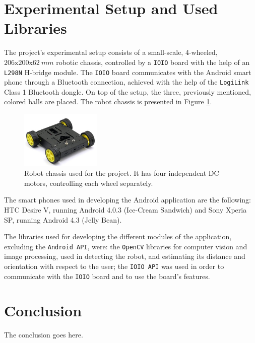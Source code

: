 \documentclass[journal]{IEEEtran}
\let\MYoriglatexcaption\caption
\renewcommand{\caption}[2][\relax]{\MYoriglatexcaption[#2]{#2}}
\begin{document}
\section{Experimental Setup and Used Libraries}
The project's experimental setup consists of a small-scale, 4-wheeled, $206\mathrm{x}200\mathrm{x}62\ mm$ robotic chassis, controlled by a \texttt{IOIO} board with the help of an \texttt{L298N} H-bridge module. The \texttt{IOIO} board communicates with the Android smart phone through a Bluetooth connection, achieved with the help of the \texttt{LogiLink} Class 1 Bluetooth dongle. On top of the setup, the three, previously mentioned, colored balls are placed. The robot chassis is presented in Figure \ref{fig:robot}.
\begin{figure}[!htpb]
  \centering
  \includegraphics[width=1.5in]{images/robot}
  \caption{Robot chassis used for the project. It has four independent DC motors, controlling each wheel separately.}
  \label{fig:robot}
\end{figure}

The smart phones used in developing the Android application are the following: HTC Desire V, running Android 4.0.3 (Ice-Cream Sandwich) and Sony Xperia SP, running Android 4.3 (Jelly Bean).

The libraries used for developing the different modules of the application, excluding the \texttt{Android API}, were: the \texttt{OpenCV} libraries for computer vision and image processing, used in detecting the robot, and estimating its distance and orientation with respect to the user; the \texttt{IOIO API} was used in order to communicate with the \texttt{IOIO} board and to use the board's features.



\section{Conclusion}
The conclusion goes here.



\end{document}

